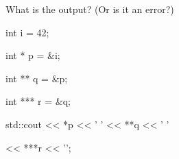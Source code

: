 What is the output? (Or is it an error?)



\begin{consolethree}[escapeinside=||]

int i = 42;

int * p = &i;

int ** q = &p;

int *** r = &q;



std::cout << *p << ' ' << **q << ' '

          << ***r << '\n'; 

\end{consolethree}

